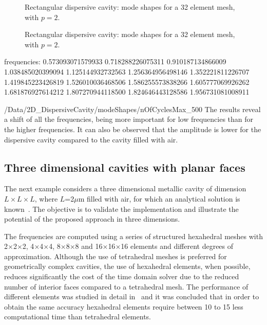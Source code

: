 \begin{figure}[!ht]
\centering
{}
\caption{Rectangular dispersive cavity: mode shapes for a 32 element mesh, with $p=2$.}
\label{fig:dispersiveFreeSpaceSpectrum}
\end{figure}

\begin{figure}[!ht]
\centering
{}
\caption{Rectangular dispersive cavity: mode shapes for a 32 element mesh, with $p=2$.}
\label{fig:dispersiveFreeSpaceSpectrum}
\end{figure}

frequencies:
0.573093071579933
0.718288226075311
0.910187134866009
1.038485020399094
1.125144932732563
1.256364956498146
1.352221811226707
1.419845223426819
1.526010036468506
1.586255573838266
1.605777069926262
1.681876927614212
1.807270944118500
1.824646443128586
1.956731081008911

/Data/2D_DispersiveCavity/modeShapes/nOfCyclesMax_500
The results reveal a shift of all the frequencies, being more important for low frequencies than for the higher frequencies. It can also be observed that the amplitude is lower for the dispersive cavity compared to the cavity filled with air.


\clearpage
\subsection{Three dimensional cavities with planar faces}
The next example considers a three dimensional metallic cavity of dimension $L\times L \times L$, where $L$=2$\mu$m filled with air, for which an analytical solution is known~\cite{BalanisBook}. The objective is to validate the implementation and illustrate the potential of the proposed approach in three dimensions.  

The frequencies are computed using a series of structured hexahedral meshes with 2$\times$2$\times$2, 4$\times$4$\times$4, 8$\times$8$\times$8 and 16$\times$16$\times$16 elements and different degrees of approximation. Although the use of tetrahedral meshes is preferred for geometrically complex cavities, the use of hexahedral elements, when possible, reduces significantly the cost of the time domain solver due to the reduced number of interior faces compared to a tetrahedral mesh. The performance of different elements was studied in detail in~\cite{HybridMeshesCEM} and it was concluded that in order to obtain the same accuracy hexahedral elements require between 10 to 15 less computational time than tetrahedral elements.

